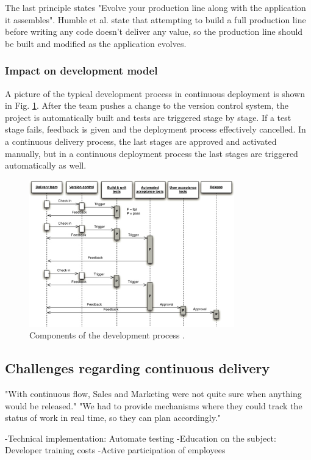 \documentclass[english]{tktltiki2}
\theoremstyle{definition}
\theoremstyle{remark}
\begin{document}
The last principle states "Evolve your production line along with the application it assembles". Humble et al. state that attempting to build a full production line before writing any code doesn't deliver any value, so the production line should be built and modified as the application evolves. 

\subsubsection{Impact on development model}

A picture of the typical development process in continuous deployment is shown in Fig. \ref{fig3}. After the team pushes a change to the version control system, the project is automatically built and tests are triggered stage by stage. If a test stage fails, feedback is given and the deployment process effectively cancelled. In a continuous delivery process, the last stages are approved and activated manually, but in a continuous deployment process the last stages are triggered automatically as well.

\begin{figure}[h]
	\centering
	\includegraphics[width=3.5in]{developmentprocess.jpg}
	\caption{Components of the development process \cite{cdbook}.}
	\label{fig3}
\end{figure}


\subsection{Challenges regarding continuous delivery}

"With continuous flow, Sales and Marketing were not quite sure when anything would be released." "We had to provide mechanisms where they could track the status of work in real time, so they can plan accordingly." \cite{neely2013continuous}

-Technical implementation: Automate testing
-Education on the subject: Developer training costs
-Active participation of employees
\end{document}
